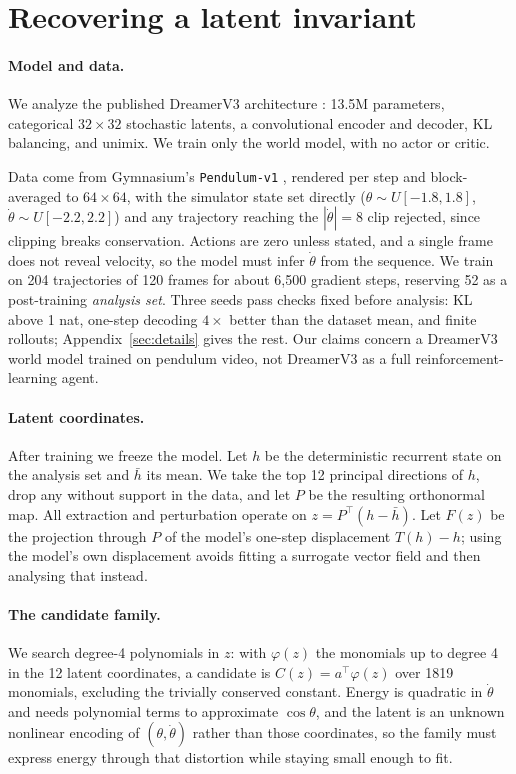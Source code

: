 \section{Recovering a latent invariant}
\label{sec:setup}

\paragraph{Model and data.} We analyze the published DreamerV3 architecture
\citep{hafner2023dreamerv3}: 13.5M parameters, categorical $32\times32$ stochastic latents, a
convolutional encoder and decoder, KL balancing, and unimix. We train only the world model, with no
actor or critic.

Data come from Gymnasium's \texttt{Pendulum-v1} \citep{towers2024gymnasium}, rendered per step and
block-averaged to $64\times64$, with the simulator state set directly
($\theta\sim U[-1.8,1.8]$, $\dot\theta\sim U[-2.2,2.2]$) and any trajectory reaching the
$|\dot\theta|=8$ clip rejected, since clipping breaks conservation. Actions are zero unless stated,
and a single frame does not reveal velocity, so the model must infer $\dot\theta$ from the sequence.
We train on 204 trajectories of 120 frames for about 6{,}500 gradient steps, reserving 52 as a
post-training \emph{analysis set}. Three seeds pass checks fixed before analysis: KL above 1 nat,
one-step decoding $4\times$ better than the dataset mean, and finite rollouts;
Appendix~\ref{sec:details} gives the rest. Our claims concern a DreamerV3
world model trained on pendulum video, not DreamerV3 as a full reinforcement-learning agent.

\paragraph{Latent coordinates.} After training we freeze the model. Let $h$ be the deterministic
recurrent state on the analysis set and $\bar h$ its mean. We take the top 12 principal directions of
$h$, drop any without support in the data, and let $P$ be the resulting orthonormal map. All
extraction and perturbation operate on $z = P^\top(h-\bar h)$. Let $F(z)$ be the projection through
$P$ of the model's one-step displacement $T(h)-h$; using the model's own displacement avoids fitting
a surrogate vector field and then analysing that instead.

\paragraph{The candidate family.} We search degree-4 polynomials in $z$: with $\varphi(z)$ the
monomials up to degree 4 in the 12 latent coordinates, a candidate is $C(z) = a^\top\varphi(z)$ over
1819 monomials, excluding the trivially conserved constant. Energy is quadratic in $\dot\theta$ and
needs polynomial terms to approximate $\cos\theta$, and the latent is an unknown nonlinear encoding
of $(\theta,\dot\theta)$ rather than those coordinates, so the family must express energy through
that distortion while staying small enough to fit.

